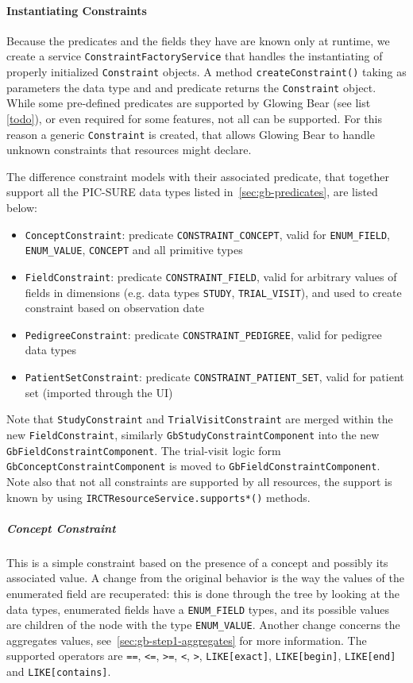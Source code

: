 \paragraph{Instantiating Constraints}
Because the predicates and the fields they have are known only at runtime, we create a service \verb|ConstraintFactoryService| that handles the instantiating of properly initialized \verb|Constraint| objects.
A method \verb|createConstraint()| taking as parameters the data type and and predicate returns the \verb|Constraint| object.
While some pre-defined predicates are supported by Glowing Bear (see list \ref{todo}), or even required for some features, not all can be supported. 
For this reason a generic \verb|Constraint| is created, that allows Glowing Bear to handle unknown constraints that resources might declare.

The difference constraint models with their associated predicate, that together support all the PIC-SURE data types listed in~\ref{sec:gb-predicates}, are listed below:
\begin{itemize}
    \item \verb|ConceptConstraint|: predicate \verb|CONSTRAINT_CONCEPT|, valid for \verb|ENUM_FIELD|, \verb|ENUM_VALUE|, \verb|CONCEPT| and all primitive types 
    \item \verb|FieldConstraint|: predicate \verb|CONSTRAINT_FIELD|, valid for arbitrary values of fields in dimensions (e.g. data types \verb|STUDY|, \verb|TRIAL_VISIT|), and used to create constraint based on observation date
    \item \verb|PedigreeConstraint|: predicate \verb|CONSTRAINT_PEDIGREE|, valid for pedigree data types
    \item \verb|PatientSetConstraint|: predicate \verb|CONSTRAINT_PATIENT_SET|, valid for patient set (imported through the UI)
\end{itemize}

Note that \verb|StudyConstraint| and \verb|TrialVisitConstraint| are merged within the new \verb|FieldConstraint|, similarly \verb|GbStudyConstraintComponent| into the new \verb|GbFieldConstraintComponent|.
The trial-visit logic form \verb|GbConceptConstraintComponent| is moved to \verb|GbFieldConstraintComponent|.
Note also that not all constraints are supported by all resources, the support is known by using \verb|IRCTResourceService.supports*()| methods. 

\subparagraph{Concept Constraint}
This is a simple constraint based on the presence of a concept and possibly its associated value.
A change from the original behavior is the way the values of the enumerated field are recuperated: this is done through the tree by looking at the data types, enumerated fields have a \verb|ENUM_FIELD| types, and its possible values are children of the node with the type \verb|ENUM_VALUE|.
Another change concerns the aggregates values, see~\ref{sec:gb-step1-aggregates} for more information.
The supported operators are \verb|==|, \verb|<=|, \verb|>=|, \verb|<|, \verb|>|, \verb|LIKE[exact]|, \verb|LIKE[begin]|, \verb|LIKE[end]| and \verb|LIKE[contains]|.

